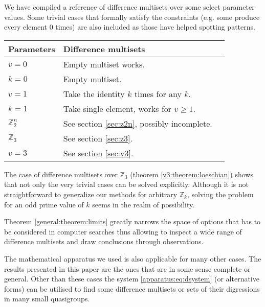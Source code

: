 We have compiled a reference of difference multisets over some select parameter values. Some trivial cases that formally satisfy the constraints (e.g. some produce every element 0 times) are also included as those have helped spotting patterns.

\begin{tabular}{llr}
\toprule
    Parameters & Difference multisets \\
\midrule
    $v = 0$ & Empty multiset works. \\
    $k = 0$ & Empty multiset. \\
    $v = 1$ & Take the identity $k$ times for any $k$. \\
    $k = 1$ & Take single element, works for $v \geq 1$. \\
    $\mathbb Z_2^n$ & See section \ref{sec:z2n}, possibly incomplete. \\
    $\mathbb Z_3$ & See section \ref{sec:z3}. \\
    $v = 3$ & See section \ref{sec:v3}. \\    
\bottomrule
\end{tabular}


The case of difference multisets over $\mathbb Z_3$ (theorem \ref{v3:theorem:loeschian}) shows that not only the very trivial cases can be solved explicitly. Although it is not straightforward to generalize our methods for arbitrary $\mathbb Z_k$, solving the problem for an odd prime value of $k$ seems in the realm of possibility.

Theorem \ref{general:theorem:limits} greatly narrows the space of options that has to be considered in computer searches thus allowing to inspect a wide range of difference multisets and draw conclusions through observations.

The mathematical apparatus we used is also applicable for many other cases. The results presented in this paper are the ones that are in some sense complete or general. Other than these cases the system \eqref{apparatus:eq:dsystem} (or alternative forms) can be utilised to find some difference multisets or sets of their digressions in many small quasigroups. 
